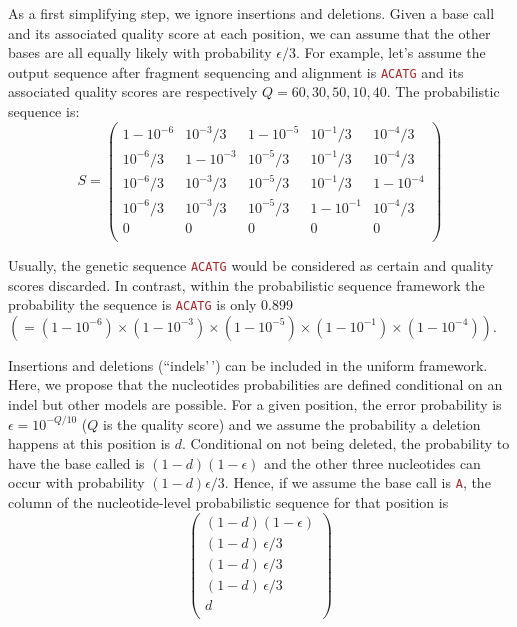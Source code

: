 \documentclass[
]{article}
\newcommand{\sq}[1]{\texttt{\textcolor{brown}{#1}}}
\newcommand{\nlps}{nucleotide-level probabilistic sequence\xspace}
\begin{document}
As a first simplifying step, we ignore insertions and deletions. Given a
base call and its associated quality score at each position, we can
assume that the other bases are all equally likely with probability
\(\epsilon/3\). For example, let's assume the output sequence after
fragment sequencing and alignment is \sq{ACATG} and its associated
quality scores are respectively \(Q=60,30,50,10,40\). The probabilistic
sequence is: \begin{equation}
S = 
\begin{pmatrix}
1-10^{-6} & 10^{-3}/3  & 1-10^{-5} & 10^{-1}/3 & 10^{-4}/3  \\
10^{-6}/3 & 1-10^{-3}  & 10^{-5}/3 & 10^{-1}/3 & 10^{-4}/3  \\
10^{-6}/3 & 10^{-3}/3  & 10^{-5}/3 & 10^{-1}/3 & 1-10^{-4} \\
10^{-6}/3 & 10^{-3}/3  & 10^{-5}/3 & 1-10^{-1} & 10^{-4}/3\\
0&0&0&0&0 \\
\end{pmatrix}
\end{equation}

Usually, the genetic sequence \sq{ACATG} would be considered as certain
and quality scores discarded. In contrast, within the probabilistic
sequence framework the probability the sequence is \sq{ACATG} is only
0.899
\({\displaystyle(=(1-10^{-6})\times (1-10^{-3})\times (1-10^{-5})\times (1-10^{-1})\times (1-10^{-4}))}\).

Insertions and deletions (``indels'\,') can be included in the uniform
framework. Here, we propose that the nucleotides probabilities are
defined conditional on an indel but other models are possible. For a
given position, the error probability is \(\epsilon = 10^{-Q/10}\)
(\(Q\) is the quality score) and we assume the probability a deletion
happens at this position is \(d\). Conditional on not being deleted, the
probability to have the base called is \((1-d)(1-\epsilon)\) and the
other three nucleotides can occur with probability \((1-d)\epsilon/3\).
Hence, if we assume the base call is \sq{A}, the column of the \nlps for
that position is \begin{equation}
\begin{pmatrix}
(1-d)(1-\epsilon)  \\
(1-d)\,\epsilon / 3  \\
(1-d)\,\epsilon / 3  \\
(1-d)\,\epsilon / 3  \\
d\\
\end{pmatrix}
\label{eq:deletion}
\end{equation}
\end{document}
